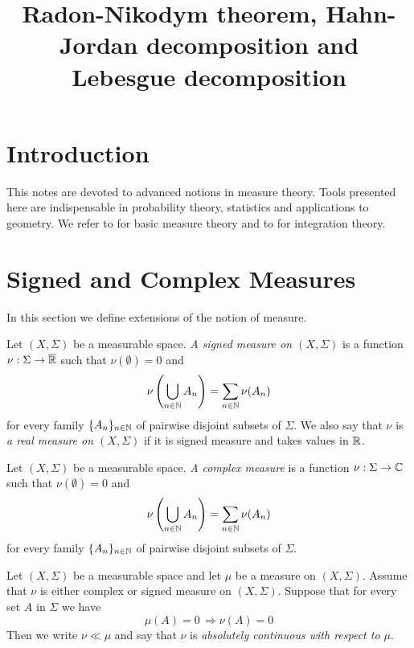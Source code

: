 



\title{Radon-Nikodym theorem, Hahn-Jordan decomposition and Lebesgue decomposition}
\date{}
\maketitle

\section{Introduction}
\noindent
This notes are devoted to advanced notions in measure theory. Tools presented here are indispensable in probability theory, statistics and applications to geometry. We refer to \cite{Introductiontomeasuretheory} for basic measure theory and to \cite{Integration} for integration theory.

\section{Signed and Complex Measures}
\noindent
In this section we define extensions of the notion of measure. 

\begin{definition}
Let $\left(X,\Sigma\right)$ be a measurable space. \textit{A signed measure on $(X,\Sigma)$} is a function $\nu:\Sigma\rightarrow \overline{{\mathbb R}}$ such that $\nu(\emptyset)=0$ and 
$$\nu\left(\bigcup_{n\in {\mathbb N}}A_n\right)=\sum_{n\in {\mathbb N}}\nu(A_n)$$
for every family $\{A_n\}_{n\in {\mathbb N}}$ of pairwise disjoint subsets of $\Sigma$. We also say that $\nu$ is \textit{a real measure on $(X,\Sigma)$} if it is signed measure and takes values in ${\mathbb R}$.
\end{definition}

\begin{definition}
Let $\left(X,\Sigma\right)$ be a measurable space. \textit{A complex measure} is a function $\nu:\Sigma\rightarrow {\mathbb C}$ such that $\nu(\emptyset)=0$ and 
$$\nu\left(\bigcup_{n\in {\mathbb N}}A_n\right)=\sum_{n\in {\mathbb N}}\nu(A_n)$$
for every family $\{A_n\}_{n\in {\mathbb N}}$ of pairwise disjoint subsets of $\Sigma$. 
\end{definition}

\begin{definition}
Let $(X,\Sigma)$ be a measurable space and let $\mu$ be a measure on $(X,\Sigma)$. Assume that $\nu$ is either complex or signed measure on $(X,\Sigma)$. Suppose that for every set $A$ in $\Sigma$ we have
$$\mu(A) = 0\,\Rightarrow \nu(A)=0$$
Then we write $\nu \ll \mu$ and say that $\nu$ is \textit{absolutely continuous with respect to $\mu$}.
\end{definition}

